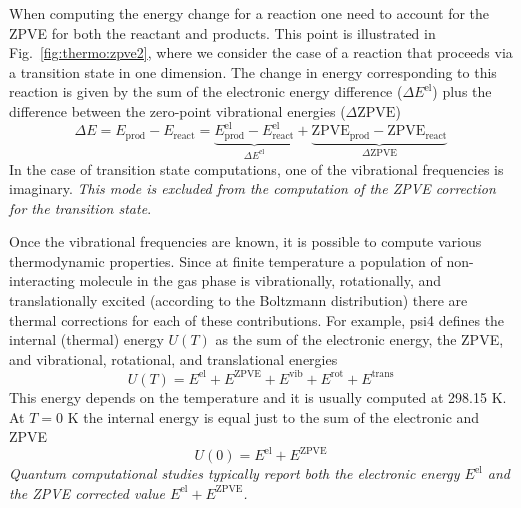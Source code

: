\documentclass[../Main/chem371-notes.tex]{subfiles}
\begin{document}

When computing the energy change for a reaction one need to account for the ZPVE for both the reactant and products.
This point is illustrated in Fig.~\ref{fig:thermo:zpve2}, where we consider the case of a reaction that proceeds via a transition state in one dimension.
The change in energy corresponding to this reaction is given by the sum of the electronic energy difference ($\Delta E^\text{el}$) plus the difference between the zero-point vibrational energies ($\Delta \text{ZPVE}$)
\begin{equation}
\Delta E = E_\text{prod} - E_\text{react} = 
\underbrace{E^\text{el}_\text{prod} - E^\text{el}_\text{react}}_{\Delta E^\text{el}}
+ \underbrace{\text{ZPVE}_\text{prod} - \text{ZPVE}_\text{react}}_{\Delta \text{ZPVE}}
\end{equation}
In the case of transition state computations, one of the vibrational frequencies is imaginary. \emph{This mode is excluded from the computation of the ZPVE correction for the transition state}.

Once the vibrational frequencies are known, it is possible to compute various thermodynamic properties.
Since at finite temperature a population of non-interacting molecule in the gas phase is vibrationally, rotationally, and translationally excited (according to the Boltzmann distribution) there are thermal corrections for each of these contributions.
For example, psi4 defines the internal (thermal) energy $U(T)$ as the sum of the electronic energy, the ZPVE, and vibrational, rotational, and translational energies
\begin{equation}
U(T) = E^{\mathrm{el}} + E^{\mathrm{ZPVE}}
+ E^{\mathrm{vib}} + E^{\mathrm{rot}} + E^{\mathrm{trans}}
\end{equation}
This energy depends on the temperature and it is usually computed at 298.15 K.
At $T  = 0 $ K the internal energy is equal just to the sum of the electronic and ZPVE
\begin{equation}
U(0) = E^{\mathrm{el}} + E^{\mathrm{ZPVE}}
\end{equation}
\emph{Quantum computational studies typically report both the electronic energy $ E^{\mathrm{el}}$ and the ZPVE corrected value $E^{\mathrm{el}} + E^{\mathrm{ZPVE}}$.}
\end{document}
